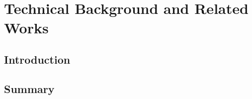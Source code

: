 
\chapter{Technical Background and Related Works} \label{chap:background}
    \section{Introduction}
    
    
    \section{Summary}